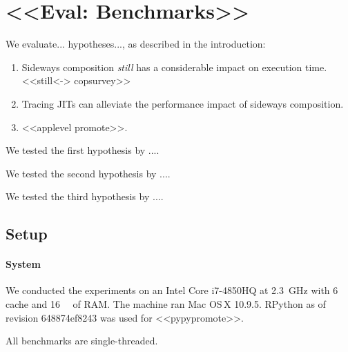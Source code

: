 \documentclass[preprint,english,10pt,nonatbib]{sigplanconf}
\begin{document}
\section{<<Eval: Benchmarks>>}


\def\idBox#1#2{%
\setlength{\fboxsep}{1pt}%
\colorbox[HTML]{#1}{\textcolor[gray]{0.9}{\rule[0.1pt]{0pt}{5pt}#2}}%
\xspace}



We evaluate... hypotheses..., as described in the introduction:
\begin{enumerate}
\item Sideways composition \emph{still} has a considerable impact on execution
  time. <<still<-> copsurvey>>
\item Tracing JITs can alleviate the performance impact of sideways composition.
\item <<applevel promote>>.
\end{enumerate}



We tested the first hypothesis by ....

We tested the second hypothesis by ....

We tested the third hypothesis by ....


\subsection{Setup}
\label{sec:setup}


\paragraph{System} We conducted the experiments on %
an Intel Core i7-4850HQ at \SI{2.3}{\GHz} with \SI{6}{\mega\byte} cache and
\SI{16}{\giga\byte} of RAM. The machine ran Mac OS\,X 10.9.5.
%
RPython as of revision
648874ef8243
 was used for <<pypypromote>>.

All benchmarks are single-threaded.
\end{document}
